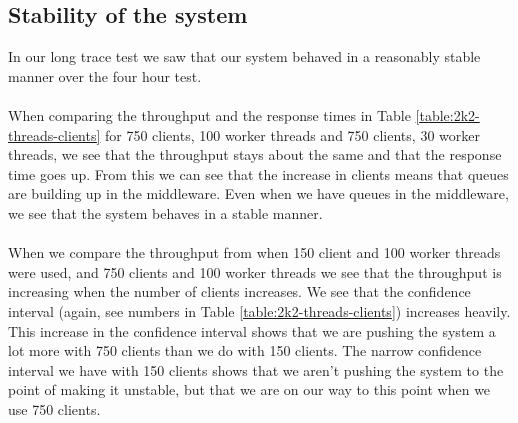 \documentclass{article}
\begin{document}
        \subsection{Stability of the system}
            In our long trace test we saw that our system behaved in a reasonably stable manner over the four hour test.\\
            \\
            When comparing the throughput and the response times in Table \ref{table:2k2-threads-clients} for 750 clients, 100 worker threads and 750 clients, 30 worker threads, we see that the throughput stays about the same and that the response time goes up. From this we can see that the increase in clients means that queues are building up in the middleware. Even when we have queues in the middleware, we see that the system behaves in a stable manner.\\
            \\
            When we compare the throughput from when 150 client and 100 worker threads were used, and 750 clients and 100 worker threads we see that the throughput is increasing when the number of clients increases. We see that the confidence interval (again, see numbers in Table \ref{table:2k2-threads-clients}) increases heavily. This increase in the confidence interval shows that we are pushing the system a lot more with 750 clients than we do with 150 clients. The narrow confidence interval we have with 150 clients shows that we aren't pushing the system to the point of making it unstable, but that we are on our way to this point when we use 750 clients. \\
            \\
\end{document}
